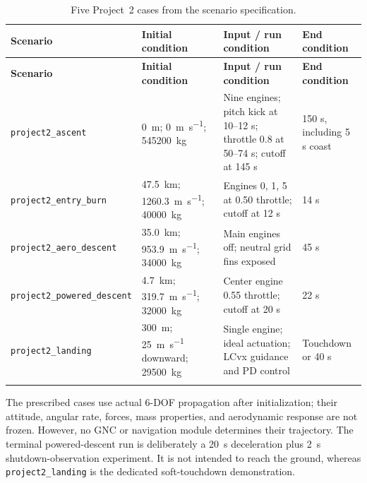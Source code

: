 \documentclass[11pt,letterpaper]{article}
\newcommand{\sourcecode}[1]{\texttt{#1}}
\begin{document}
\begin{longtable}{@{}p{}p{}p{}p{}@{}}
\toprule
\rowcolor{navy}\color{white}\textbf{Scenario} & \color{white}\textbf{Initial condition} & \color{white}\textbf{Input / run condition} & \color{white}\textbf{End condition}\\
\midrule
\endfirsthead
\toprule
\rowcolor{navy}\color{white}\textbf{Scenario} & \color{white}\textbf{Initial condition} & \color{white}\textbf{Input / run condition} & \color{white}\textbf{End condition}\\
\midrule
\endhead
\sourcecode{project2\_\allowbreak ascent} & \SI{0}{\metre}; \SI{0}{\metre\per\second}; \SI{545200}{\kilogram} & Nine engines; pitch kick at 10--12 s; throttle 0.8 at 50--74 s; cutoff at 145 s & 150 s, including 5 s coast\\
\rowcolor{lightblue}
\sourcecode{project2\_\allowbreak entry\_\allowbreak burn} & \SI{47.5}{\kilo\metre}; \SI{1260.3}{\metre\per\second}; \SI{40000}{\kilogram} & Engines 0, 1, 5 at 0.50 throttle; cutoff at 12 s & 14 s\\
\sourcecode{project2\_\allowbreak aero\_\allowbreak descent} & \SI{35.0}{\kilo\metre}; \SI{953.9}{\metre\per\second}; \SI{34000}{\kilogram} & Main engines off; neutral grid fins exposed & 45 s\\
\rowcolor{lightblue}
\sourcecode{project2\_\allowbreak powered\_\allowbreak descent} & \SI{4.7}{\kilo\metre}; \SI{319.7}{\metre\per\second}; \SI{32000}{\kilogram} & Center engine 0.55 throttle; cutoff at 20 s & 22 s\\
\sourcecode{project2\_\allowbreak landing} & \SI{300}{\metre}; \SI{25}{\metre\per\second} downward; \SI{29500}{\kilogram} & Single engine; ideal actuation; LCvx guidance and PD control & Touchdown or 40 s\\
\bottomrule
\caption{Five Project~2 cases from the scenario specification.}\label{tab:scenarios}
\end{longtable}

The prescribed cases use actual 6-DOF propagation after initialization; their attitude, angular rate, forces, mass properties, and aerodynamic response are not frozen. However, no GNC or navigation module determines their trajectory. The terminal powered-descent run is deliberately a \SI{20}{\second} deceleration plus \SI{2}{\second} shutdown-observation experiment. It is not intended to reach the ground, whereas \sourcecode{project2\_landing} is the dedicated soft-touchdown demonstration.
\end{document}
